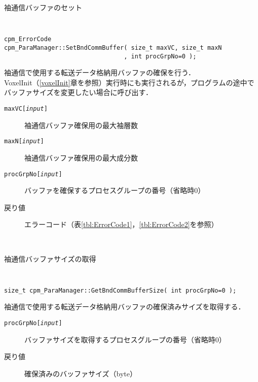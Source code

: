 \begin{spacing}{0.8}
\begin{itembox}[l]{袖通信バッファのセット}
{\tt
\begin{verbatim}
cpm_ErrorCode
cpm_ParaManager::SetBndCommBuffer( size_t maxVC, size_t maxN
                                 , int procGrpNo=0 );
\end{verbatim}
}
袖通信で使用する転送データ格納用バッファの確保を行う．\\
VoxelInit（\ref{voxelInit}章を参照）実行時にも実行されるが，プログラムの途中で
バッファサイズを変更したい場合に呼び出す．
\begin{description}
\item[{\tt maxVC[{\it input}]}] 袖通信バッファ確保用の最大袖層数
\item[{\tt maxN[{\it input}]}] 袖通信バッファ確保用の最大成分数
\item[{\tt procGrpNo[{\it input}]}] バッファを確保するプロセスグループの番号（省略時0）
\\
\item[戻り値] エラーコード（表\ref{tbl:ErrorCode1}，\ref{tbl:ErrorCode2}を参照）
\end{description}
\end{itembox}\\
\end{spacing}

\begin{spacing}{0.8}
\begin{itembox}[l]{袖通信バッファサイズの取得}
{\tt
\begin{verbatim}
size_t cpm_ParaManager::GetBndCommBufferSize( int procGrpNo=0 );
\end{verbatim}
}
袖通信で使用する転送データ格納用バッファの確保済みサイズを取得する．
\begin{description}
\item[{\tt procGrpNo[{\it input}]}] バッファサイズを取得するプロセスグループの番号（省略時0）
\\
\item[戻り値] 確保済みのバッファサイズ（byte）
\end{description}
\end{itembox}\\
\end{spacing}

